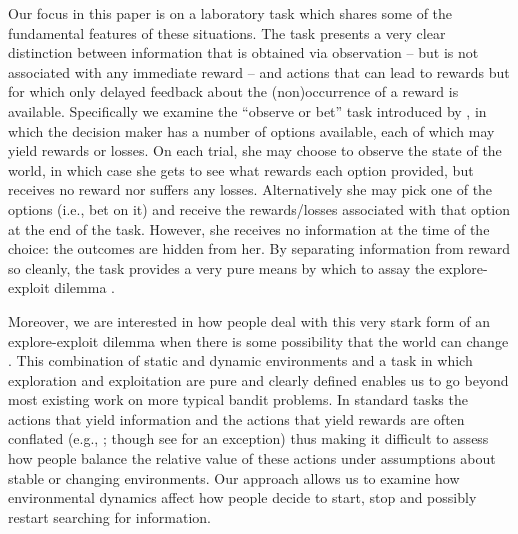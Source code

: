 \documentclass[authoryear]{elsarticle}
\begin{document}
Our focus in this paper is on a laboratory task which shares some of the fundamental features of these situations. The task presents a very clear distinction between information that is obtained via observation -- but is not associated with any immediate reward -- and actions that can lead to rewards but for which only delayed feedback about the (non)occurrence of a reward is available.  Specifically we examine the ``observe or bet''  task introduced by \citet{tversky_information_1966}, in which the decision maker has a number of options available, each of which may yield rewards or losses. On each trial, she may choose to observe the state of the world, in which case she gets to see what rewards each option provided, but receives no reward nor suffers any losses.  Alternatively she may pick one of the options (i.e., bet on it)  and receive the rewards/losses associated with that option at the end of the task. However, she receives no information at the time of the choice: the outcomes are hidden from her. By separating information from reward so cleanly, the task provides a very pure means by which to assay the explore-exploit dilemma \citep[e.g.,][]{mehlhorn_unpacking_INPRESS,cohen_should_2007,hills_exploration_2015}.

Moreover, we are interested in how people deal with this very stark form of an explore-exploit dilemma when there is some possibility that the world can change \citep[cf.][]{knox_nature_2011,gureckis_learning_2009,daw_cortical_2006,speekenbrink_uncertainty_2014,speekenbrink_uncertainty_2015}. This combination of static and dynamic environments and a task in which exploration and exploitation are pure and clearly defined enables us to go beyond most existing work on more typical bandit problems. In standard tasks the actions that yield information and the actions that yield rewards are often conflated (e.g., \citealp{robbins_aspects_1952,steyvers_bayesian_2009}; though see \citealp{sang_learning_2011} for an exception) thus making it difficult to assess how people balance the relative value of these actions under assumptions about stable or changing environments. Our approach allows us to examine how environmental dynamics affect how people decide to start, stop and possibly restart searching for information.
\end{document}
